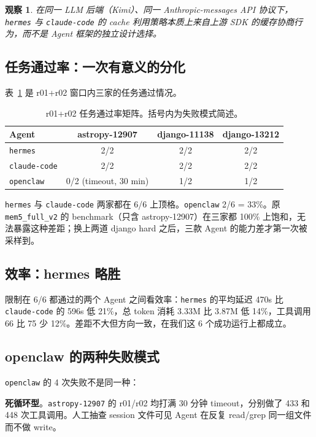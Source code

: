 \documentclass[11pt,a4paper]{article}
\newtheorem{observation}{观察}
\begin{document}
\begin{observation}
在同一 LLM 后端（Kimi）、同一 Anthropic-messages API 协议下，\texttt{hermes} 与 \texttt{claude-code} 的 cache 利用策略本质上来自上游 SDK 的缓存协商行为，而不是 Agent 框架的独立设计选择。
\end{observation}

\subsection{任务通过率：一次有意义的分化}
\label{sec:pass-rate}
表~\ref{tab:pass-rate} 是 r01+r02 窗口内三家的任务通过情况。

\begin{table}[h]
\centering
\caption{r01+r02 任务通过率矩阵。括号内为失败模式简述。}
\label{tab:pass-rate}
\begin{tabular}{lccc}
\toprule
Agent & astropy-12907 & django-11138 & django-13212 \\
\midrule
\texttt{hermes}      & 2/2 & 2/2 & 2/2 \\
\texttt{claude-code} & 2/2 & 2/2 & 2/2 \\
\texttt{openclaw}    & 0/2 (timeout, 30 min) & 1/2 & 1/2 \\
\bottomrule
\end{tabular}
\end{table}

\texttt{hermes} 与 \texttt{claude-code} 两家都在 6/6 上顶格。\texttt{openclaw} 2/6 = 33\%。原 \texttt{mem5\_full\_v2} 的 benchmark（只含 astropy-12907）在三家都 100\% 上饱和，无法暴露这种差距；换上两道 django hard 之后，三款 Agent 的能力差才第一次被采样到。

\subsection{效率：hermes 略胜}
限制在 6/6 都通过的两个 Agent 之间看效率：\texttt{hermes} 的平均延迟 470s 比 \texttt{claude-code} 的 596s 低 21\%，总 token 消耗 3.33M 比 3.87M 低 14\%，工具调用 66 比 75 少 12\%。差距不大但方向一致，在我们这 6 个成功运行上都成立。

\subsection{openclaw 的两种失败模式}
\label{sec:openclaw-fail}
\texttt{openclaw} 的 4 次失败不是同一种：

\textbf{死循环型}。\texttt{astropy-12907} 的 r01/r02 均打满 30 分钟 timeout，分别做了 433 和 448 次工具调用。人工抽查 session 文件可见 Agent 在反复 read/grep 同一组文件而不做 write。
\end{document}

